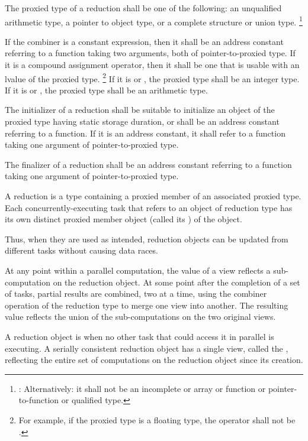 \pnum
The proxied type of a reduction shall be
one of the following:
an unqualified arithmetic type,
a pointer to object type,
or a complete structure or union type.%
\footnote{:
Alternatively: it shall not be
an incomplete or array or function
or pointer-to-function or qualified type.
}

\pnum
If the combiner is a constant expression,
then it shall be an address constant
referring to a function taking two arguments,
both of pointer-to-proxied type.
If it is a compound assignment operator,
then it shall be one that is usable with an lvalue of the proxied type.%
\footnote{
For example, if the proxied type is a floating type,
the operator shall not be
\tcode{|=}.
}
If it is
or
,
the proxied type shall be an integer type.
If it is
or
,
the proxied type shall be an arithmetic type.

\pnum
The initializer of a reduction
shall be suitable to initialize
an object of the proxied type
having static storage duration,
or shall be an address constant referring to a function.
If it is an address constant,
it shall refer to a function
taking one argument of pointer-to-proxied type.

\pnum
The finalizer of a reduction
shall be an address constant referring to a function
taking one argument of pointer-to-proxied type.


\pnum
A reduction is a type containing a proxied member
of an associated proxied type.
Each concurrently-executing task
that refers to an object of reduction type
has its own distinct proxied member object
(called its
)
of the object.

\begin{note}
Thus, when they are used as intended,
reduction objects can be updated from different tasks
without causing data races.
\end{note}

\pnum
At any point within a parallel computation,
the value of a view reflects a sub-computation on the reduction object.
At some point after the completion of a set of tasks,
partial results are combined, two at a time,
using the combiner operation of the reduction type
to merge one view into another.
The resulting value reflects the union
of the sub-computations on the two original views.
 
\pnum
A reduction object is
when no other task that could access it in parallel is executing.
A serially consistent reduction object has a single view,
called the
,
reflecting the entire set of computations on the reduction object
since its creation.
 
